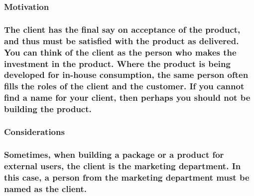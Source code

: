 \documentclass[
]{article}
\begin{document}
\hypertarget{motivation-2}{%
\subsubsection{Motivation}\label{motivation-2}}

\hypertarget{the-client-has-the-final-say-on-acceptance-of-the-product-and-thus-must-be-satisfied-with-the-product-as-delivered.-you-can-think-of-the-client-as-the-person-who-makes-the-investment-in-the-product.-where-the-product-is-being-developed-for-in-house-consumption-the-same-person-often-fills-the-roles-of-the-client-and-the-customer.-if-you-cannot-find-a-name-for-your-client-then-perhaps-you-should-not-be-building-the-product.}{%
\subsubsection{The client has the final say on acceptance of the
product, and thus must be satisfied with the product as delivered. You
can think of the client as the person who makes the investment in the
product. Where the product is being developed for in-house consumption,
the same person often fills the roles of the client and the customer. If
you cannot find a name for your client, then perhaps you should not be
building the
product.}\label{the-client-has-the-final-say-on-acceptance-of-the-product-and-thus-must-be-satisfied-with-the-product-as-delivered.-you-can-think-of-the-client-as-the-person-who-makes-the-investment-in-the-product.-where-the-product-is-being-developed-for-in-house-consumption-the-same-person-often-fills-the-roles-of-the-client-and-the-customer.-if-you-cannot-find-a-name-for-your-client-then-perhaps-you-should-not-be-building-the-product.}}

\hypertarget{considerations-1}{%
\subsubsection{Considerations}\label{considerations-1}}

\hypertarget{sometimes-when-building-a-package-or-a-product-for-external-users-the-client-is-the-marketing-department.-in-this-case-a-person-from-the-marketing-department-must-be-named-as-the-client.}{%
\subsubsection{Sometimes, when building a package or a product for
external users, the client is the marketing department. In this case, a
person from the marketing department must be named as the
client.}\label{sometimes-when-building-a-package-or-a-product-for-external-users-the-client-is-the-marketing-department.-in-this-case-a-person-from-the-marketing-department-must-be-named-as-the-client.}}
\end{document}
